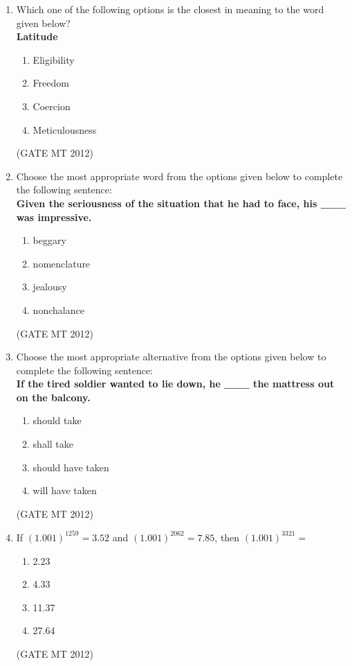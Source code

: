 \documentclass[journal, 11pt, onecolumn]{IEEEtran}
\theoremstyle{remark}
\begin{document}
\begin{enumerate}
\begin{enumerate}
\item Which one of the following options is the closest in meaning to the word given below?\\[0.5em]
\textbf{Latitude}
\begin{multicols}{2}
\begin{enumerate}  
\item Eligibility
\item Freedom
\item Coercion
\item Meticulousness
\end{enumerate}
\end{multicols}
\hfill(GATE MT 2012)

\item Choose the most appropriate word from the options given below to complete the following sentence:\\[0.5em]
\textbf{Given the seriousness of the situation that he had to face, his \_\_\_ was impressive.}
\begin{multicols}{2}
\begin{enumerate}  
\item beggary
\item nomenclature
\item jealousy
\item nonchalance
\end{enumerate}
\end{multicols}
\hfill(GATE MT 2012)

\item Choose the most appropriate alternative from the options given below to complete the following sentence:\\[0.5em]
\textbf{If the tired soldier wanted to lie down, he \_\_\_ the mattress out on the balcony.}
\begin{multicols}{2}
\begin{enumerate}  
\item should take
\item shall take
\item should have taken
\item will have taken
\end{enumerate}
\end{multicols}
\hfill(GATE MT 2012)

\item If $(1.001)^{1259} = 3.52$ and $ (1.001)^{2062} = 7.85 $, then $ (1.001)^{3321} = $
\begin{multicols}{2}
\begin{enumerate}  
\item 2.23
\item 4.33
\item 11.37
\item 27.64
\end{enumerate}
\end{multicols}
\hfill(GATE MT 2012)


\end{enumerate}
\end{enumerate}
\end{document}
